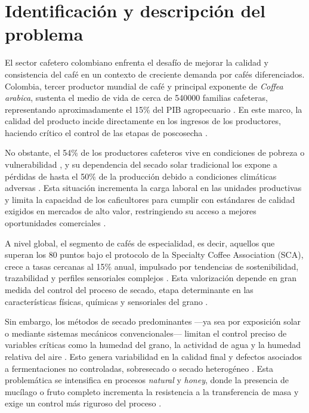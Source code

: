 \section{Identificación y descripción del problema}

El sector cafetero colombiano enfrenta el desafío de mejorar la calidad y consistencia 
del café en un contexto de creciente demanda por cafés diferenciados. Colombia, tercer 
productor mundial de café y principal exponente de \textit{Coffea arabica}, sustenta el 
medio de vida de cerca de 540000 familias cafeteras, representando aproximadamente el 
15\% del PIB agropecuario \cite{betancourt_agricultural_2024, gomez-godinez_exploring_2024}. En este marco, la calidad del producto incide directamente 
en los ingresos de los productores, haciendo crítico el control de las etapas de 
poscosecha \cite{dias_alixandre_physical_2023, abreu_influence_2025}. 

No obstante, el 54\% de los productores cafeteros vive en condiciones de pobreza o 
vulnerabilidad \parencite{navarro_munoz_sector_2024}, y su dependencia del secado solar 
tradicional los expone a pérdidas de hasta el 50\% de la producción debido a condiciones 
climáticas adversas \parencite{guevara-sanchez_effect_2019}. Esta situación incrementa la 
carga laboral en las unidades productivas y limita la capacidad de los caficultores para 
cumplir con estándares de calidad exigidos en mercados de alto valor, restringiendo su 
acceso a mejores oportunidades comerciales \parencite{dias_alixandre_physical_2023, 
parra-coronado_preliminary_2020}.

A nivel global, el segmento de cafés de especialidad, es decir, aquellos que superan los 80 
puntos bajo el protocolo de la Specialty Coffee Association (SCA), crece a tasas 
cercanas al 15\% anual, impulsado por tendencias de sostenibilidad, trazabilidad y 
perfiles sensoriales complejos \cite{barbosa_sensory_2019}. Esta valorización depende en gran medida del control 
del proceso de secado, etapa determinante en las características físicas, químicas y 
sensoriales del grano \cite{abreu_influence_2025, elhalis_role_2021}.

Sin embargo, los métodos de secado predominantes —ya sea por exposición solar o 
mediante sistemas mecánicos convencionales— limitan el control preciso de variables 
críticas como la humedad del grano, la actividad de agua y la humedad relativa del 
aire \cite{borem_quality_2018, phitakwinai_thinlayer_2019}. Esto genera variabilidad en la calidad final y defectos asociados 
a fermentaciones no controladas, sobresecado o secado heterogéneo \cite{parra-coronado_preliminary_2020, dias_alixandre_physical_2023}. Esta problemática 
se intensifica en procesos \textit{natural} y \textit{honey}, donde la presencia de mucílago o fruto 
completo incrementa la resistencia a la transferencia de masa y exige un control más 
riguroso del proceso \cite{borem_quality_2018, parra-coronado_preliminary_2020}.

